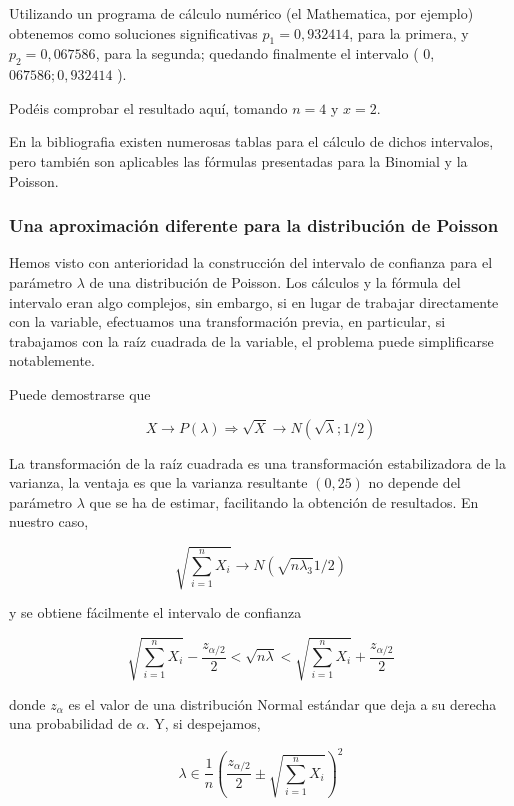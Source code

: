 \documentclass[
]{article}
\begin{document}
Utilizando un programa de cálculo numérico (el Mathematica, por ejemplo) obtenemos como soluciones significativas \(p_{1}=0,932414\), para la primera, y \(p_{2}=0,067586\), para la segunda; quedando finalmente el intervalo ( 0,\(067586 ; 0,932414\) ).

Podéis comprobar el resultado aquí, tomando \(n=4\) y \(x=2\).

En la bibliografia existen numerosas tablas para el cálculo de dichos intervalos, pero también son aplicables las fórmulas presentadas para la Binomial y la Poisson.

\subsubsection{Una aproximación diferente para la distribución de Poisson}\label{una-aproximaciuxf3n-diferente-para-la-distribuciuxf3n-de-poisson}

Hemos visto con anterioridad la construcción del intervalo de confianza para el parámetro \(\lambda\) de una distribución de Poisson. Los cálculos y la fórmula del intervalo eran algo complejos, sin embargo, si en lugar de trabajar directamente con la variable, efectuamos una transformación previa, en particular, si trabajamos con la raíz cuadrada de la variable, el problema puede simplificarse notablemente.

Puede demostrarse que

\[
X \rightarrow P(\lambda) \Rightarrow \sqrt{X} \rightarrow N(\sqrt{\lambda} ; 1 / 2)
\]

La transformación de la raíz cuadrada es una transformación estabilizadora de la varianza, la ventaja es que la varianza resultante \((0,25)\) no depende del parámetro \(\lambda\) que se ha de estimar, facilitando la obtención de resultados. En nuestro caso,

\[
\sqrt{\sum_{i=1}^{n} X_{i}} \rightarrow N\left(\sqrt{n \lambda_{3}} 1 / 2\right)
\]

y se obtiene fácilmente el intervalo de confianza

\[
\sqrt{\sum_{i=1}^{n} X_{i}}-\frac{z_{\alpha / 2}}{2}<\sqrt{n \lambda}<\sqrt{\sum_{i=1}^{n} X_{i}}+\frac{z_{\alpha / 2}}{2}
\]

donde \(z_{\alpha}\) es el valor de una distribución Normal estándar que deja a su derecha una probabilidad de \(\alpha\).
Y, si despejamos,

\[
\lambda \in \frac{1}{n}\left(\frac{z_{\alpha / 2}}{2} \pm \sqrt{\sum_{i=1}^{n} X_{i}}\right)^{2}
\]
\end{document}
